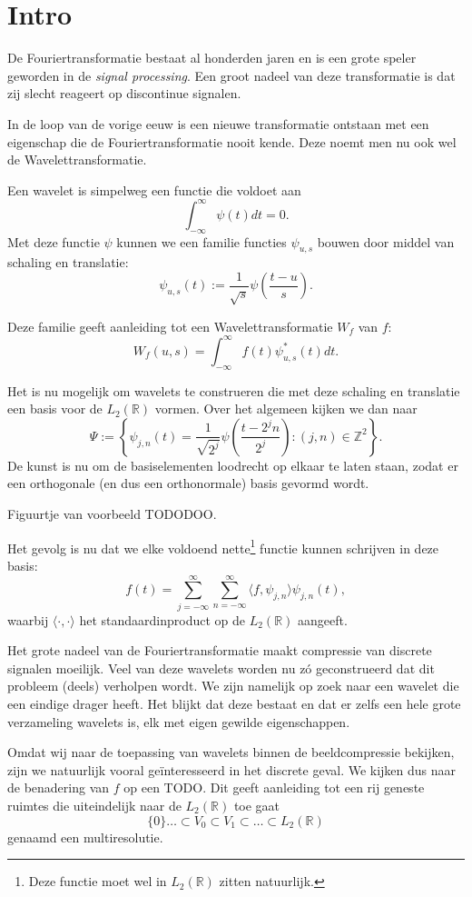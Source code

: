 \documentclass[11pt]{amsart}
\newcommand{\R}{\mathbb{R}}
\newcommand{\Z}{\mathbb{Z}}
\begin{document}
\section{Intro}
De Fouriertransformatie bestaat al honderden jaren en is een grote speler geworden in de \emph{signal processing}. Een groot nadeel van deze transformatie is dat zij slecht reageert op discontinue signalen.

In de loop van de vorige eeuw is een nieuwe transformatie ontstaan met een eigenschap die de Fouriertransformatie nooit kende. Deze noemt men nu ook wel de Wavelettransformatie.

Een wavelet is simpelweg een functie die voldoet aan
\[
  \int_{-\infty}^{\infty} \psi(t) dt = 0.
\]
Met deze functie $\psi$ kunnen we een familie functies $\psi_{u,s}$ bouwen door middel van schaling en translatie:
\[
  \psi_{u,s}(t) := \frac{1}{\sqrt{s}} \psi\left(\frac{t-u}{s}\right).
\]

Deze familie geeft aanleiding tot een Wavelettransformatie $W_f$ van $f$:
\[
  W_f(u,s) = \int_{-\infty}^\infty f(t) \psi^*_{u,s}(t) dt.
\]

Het is nu mogelijk om wavelets te construeren die met deze schaling en translatie een basis voor de $L_2(\R)$ vormen. Over het algemeen kijken we dan naar
\[
  \Psi := \left\{ \psi_{j,n}(t) = \frac{1}{\sqrt{2^j}} \psi\left( \frac{t - 2^jn}{2^j}\right) : (j,n) \in \Z^2 \right\}.
\]
De kunst is nu om de basiselementen loodrecht op elkaar te laten staan, zodat er een orthogonale (en dus een orthonormale) basis gevormd wordt. 

Figuurtje van voorbeeld TODODOO.

Het gevolg is nu dat we elke voldoend nette\footnote{Deze functie moet wel in $L_2(\R)$ zitten natuurlijk.} functie kunnen schrijven in deze basis:
\[
  f(t) = \sum_{j=-\infty}^{\infty} \sum_{n=-\infty}^{\infty} \langle f, \psi_{j,n} \rangle \psi_{j,n}(t),
\]
waarbij $\langle \cdot, \cdot \rangle$ het standaardinproduct op de $L_2(\R)$ aangeeft.

Het grote nadeel van de Fouriertransformatie maakt compressie van discrete signalen moeilijk. Veel van deze wavelets worden nu z\'o geconstrueerd dat dit probleem (deels) verholpen wordt. We zijn namelijk op zoek naar een wavelet die een eindige drager heeft. Het blijkt dat deze bestaat en dat er zelfs een hele grote verzameling wavelets is, elk met eigen gewilde eigenschappen.

Omdat wij naar de toepassing van wavelets binnen de beeldcompressie bekijken, zijn we natuurlijk vooral ge\"interesseerd in het discrete geval. We kijken dus naar de benadering van $f$ op een TODO. Dit geeft aanleiding tot een rij geneste ruimtes die uiteindelijk naar de $L_2(\R)$ toe gaat
\begin{equation}
  \label{multires}
  \{0\} \ldots \subset V_0 \subset V_1 \subset \ldots \subset L_2(\R)
\end{equation}
genaamd een multiresolutie.
\end{document}
